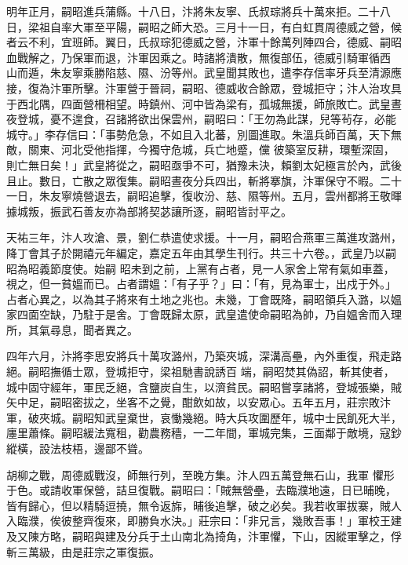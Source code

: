 \begin{pinyinscope}
 明年正月，嗣昭進兵蒲縣。十八日，汴將朱友寧、氏叔琮將兵十萬來拒。二十八日，梁祖自率大軍至平陽，嗣昭之師大恐。三月十一日，有白虹貫周德威之營，候者云不利，宜班師。翼日，氏叔琮犯德威之營，汴軍十餘萬列陣四合，德威、嗣昭血戰解之，乃保軍而退，汴軍因乘之。時諸將潰散，無復部伍，德威引騎軍循西
 山而遁，朱友寧乘勝陷慈、隰、汾等州。武皇聞其敗也，遣李存信率牙兵至清源應接，復為汴軍所擊。汴軍營于晉祠，嗣昭、德威收合餘眾，登城拒守；汴人治攻具于西北隅，四面營柵相望。時鎮州、河中皆為梁有，孤城無援，師旅敗亡。武皇晝夜登城，憂不遑食，召諸將欲出保雲州，嗣昭曰：「王勿為此謀，兒等茍存，必能城守。」李存信曰：「事勢危急，不如且入北蕃，別圖進取。朱溫兵師百萬，天下無敵，關東、河北受他指揮，今獨守危城，兵亡地蹙，儻
 彼築室反耕，環塹深固，則亡無日矣！」武皇將從之，嗣昭亟爭不可，猶豫未決，賴劉太妃極言於內，武後且止。數日，亡散之眾復集。嗣昭晝夜分兵四出，斬將搴旗，汴軍保守不暇。二十一日，朱友寧燒營退去，嗣昭追擊，復收汾、慈、隰等州。五月，雲州都將王敬暉據城叛，振武石善友亦為部將契苾讓所逐，嗣昭皆討平之。



 天祐三年，汴人攻滄、景，劉仁恭遣使求援。十一月，嗣昭合燕軍三萬進攻潞州，降丁會其子於開禧元年編定，嘉定五年由其學生刊行。共三十六卷。，武皇乃以嗣昭為昭義節度使。始嗣
 昭未到之前，上黨有占者，見一人家舍上常有氣如車蓋，視之，但一貧媼而已。占者謂媼：「有子乎？」曰：「有，見為軍士，出戍于外。」占者心異之，以為其子將來有土地之兆也。未幾，丁會既降，嗣昭領兵入潞，以媼家四面空缺，乃駐于是舍。丁會既歸太原，武皇遣使命嗣昭為帥，乃自媼舍而入理所，其氣尋息，聞者異之。



 四年六月，汴將李思安將兵十萬攻潞州，乃築夾城，深溝高壘，內外重復，飛走路絕。嗣昭撫循士眾，登城拒守，梁祖馳書說誘百
 端，嗣昭焚其偽詔，斬其使者，城中固守經年，軍民乏絕，含鹽炭自生，以濟貧民。嗣昭嘗享諸將，登城張樂，賊矢中足，嗣昭密拔之，坐客不之覺，酣飲如故，以安眾心。五年五月，莊宗敗汴軍，破夾城。嗣昭知武皇棄世，哀慟幾絕。時大兵攻圍歷年，城中士民飢死大半，廛里蕭條。嗣昭緩法寬租，勸農務穡，一二年間，軍城完集，三面鄰于敵境，寇鈔縱橫，設法枝梧，邊鄙不聳。



 胡柳之戰，周德威戰沒，師無行列，至晚方集。汴人四五萬登無石山，我軍
 懼形于色。或請收軍保營，詰旦復戰。嗣昭曰：「賊無營壘，去臨濮地遠，日已晡晚，皆有歸心，但以精騎逗撓，無令返旆，晡後追擊，破之必矣。我若收軍拔寨，賊人入臨濮，俟彼整齊復來，即勝負水決。」莊宗曰：「非兄言，幾敗吾事！」軍校王建及又陳方略，嗣昭與建及分兵于土山南北為掎角，汴軍懼，下山，因縱軍擊之，俘斬三萬級，由是莊宗之軍復振。




\end{pinyinscope}
